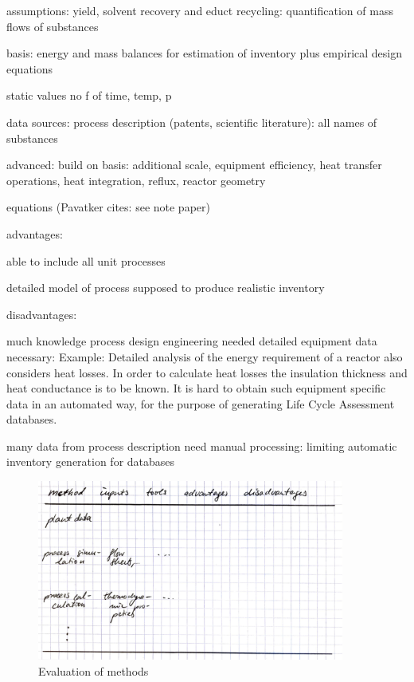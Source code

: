 assumptions: yield, solvent recovery and educt recycling: quantification of mass flows of substances

basis: energy and mass balances for estimation of inventory plus empirical design equations

static values no f of time, temp, p

data sources: process description (patents, scientific literature): all names of substances

advanced: build on basis: additional scale, equipment efficiency, heat transfer operations, heat integration, reflux, reactor geometry

equations (Pavatker cites: see note paper)


advantages:

able to include all unit processes

detailed model of process supposed to produce realistic inventory

disadvantages:

much knowledge process design engineering needed
detailed equipment data necessary: Example: \cite{Piccino.2017} Detailed analysis of the energy requirement of a reactor also considers heat losses. In order to calculate heat losses the insulation thickness and heat conductance is to be known. It is hard to obtain such equipment specific data in an automated way, for the purpose of generating Life Cycle Assessment databases.

many data from process description need manual processing: limiting automatic inventory generation for databases

\begin{figure}[htp]
        \centering
        \includegraphics[width=0.9\textwidth]{images/advantages.PNG}
        \caption{Evaluation of methods}
        \label{fig:evaluation}
\end{figure}


